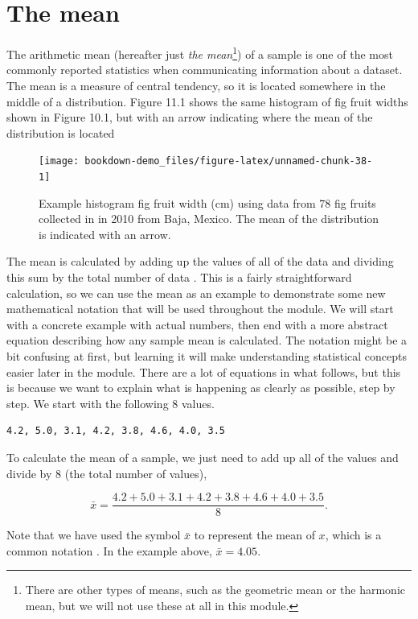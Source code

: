 \documentclass[
]{scrbook}
\begin{document}
\hypertarget{the-mean}{%
\section{The mean}\label{the-mean}}

The arithmetic mean (hereafter just \emph{the mean}\footnote{There are other types of means, such as the geometric mean or the harmonic mean, but we will not use these at all in this module.}) of a sample is one of the most commonly reported statistics when communicating information about a dataset.
The mean is a measure of central tendency, so it is located somewhere in the middle of a distribution.
Figure 11.1 shows the same histogram of fig fruit widths shown in Figure 10.1, but with an arrow indicating where the mean of the distribution is located

\begin{figure}
\texttt{[image: bookdown-demo\_files/figure-latex/unnamed-chunk-38-1]} \caption{Example histogram fig fruit width (cm) using data from 78 fig fruits collected in in 2010 from Baja, Mexico. The mean of the distribution is indicated with an arrow.}\label{fig:unnamed-chunk-38}
\end{figure}

The mean is calculated by adding up the values of all of the data and dividing this sum by the total number of data \citep{Sokal1995}.
This is a fairly straightforward calculation, so we can use the mean as an example to demonstrate some new mathematical notation that will be used throughout the module.
We will start with a concrete example with actual numbers, then end with a more abstract equation describing how any sample mean is calculated.
The notation might be a bit confusing at first, but learning it will make understanding statistical concepts easier later in the module.
There are a lot of equations in what follows, but this is because we want to explain what is happening as clearly as possible, step by step.
We start with the following 8 values.

\begin{verbatim}
4.2, 5.0, 3.1, 4.2, 3.8, 4.6, 4.0, 3.5
\end{verbatim}

To calculate the mean of a sample, we just need to add up all of the values and divide by 8 (the total number of values),

\[\bar{x} = \frac{4.2 + 5.0 + 3.1 + 4.2 + 3.8 + 4.6 + 4.0 + 3.5}{8}.\]

Note that we have used the symbol \(\bar{x}\) to represent the mean of \(x\), which is a common notation \citep{Sokal1995}.
In the example above, \(\bar{x} = 4.05\).
\end{document}
